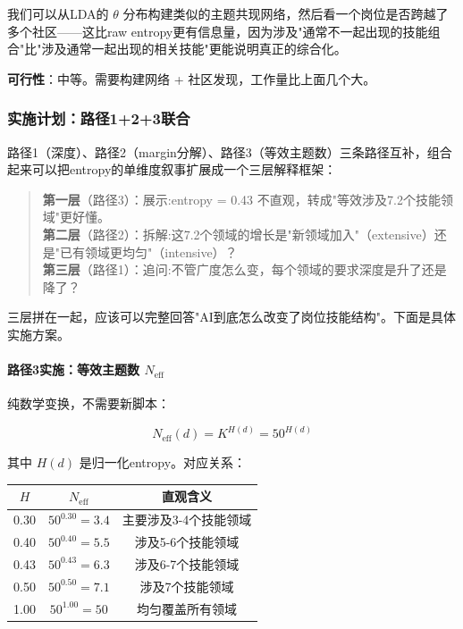 \documentclass[12pt,a4paper]{ctexart}
\begin{document}
我们可以从LDA的 $\theta$ 分布构建类似的主题共现网络，然后看一个岗位是否跨越了多个社区——这比raw entropy更有信息量，因为涉及"通常不一起出现的技能组合"比"涉及通常一起出现的相关技能"更能说明真正的综合化。

\textbf{可行性}：中等。需要构建网络 + 社区发现，工作量比上面几个大。

\subsubsection{实施计划：路径1+2+3联合}

路径1（深度）、路径2（margin分解）、路径3（等效主题数）三条路径互补，组合起来可以把entropy的单维度叙事扩展成一个三层解释框架：

\begin{quote}
\textbf{第一层}（路径3）：展示:entropy = 0.43 不直观，转成"等效涉及7.2个技能领域"更好懂。\\
\textbf{第二层}（路径2）：拆解:这7.2个领域的增长是"新领域加入"（extensive）还是"已有领域更均匀"（intensive）？\\
\textbf{第三层}（路径1）：追问:不管广度怎么变，每个领域的要求深度是升了还是降了？
\end{quote}

三层拼在一起，应该可以完整回答"AI到底怎么改变了岗位技能结构"。下面是具体实施方案。

\paragraph{路径3实施：等效主题数 $N_{\text{eff}}$}

纯数学变换，不需要新脚本：

\begin{equation}
N_{\text{eff}}(d) = K^{H(d)} = 50^{H(d)}
\end{equation}

其中 $H(d)$ 是归一化entropy。对应关系：

\begin{table}[h]
\centering
\small
\begin{tabular}{ccc}
\toprule
$H$ & $N_{\text{eff}}$ & 直观含义 \\
\midrule
0.30 & $50^{0.30} = 3.4$ & 主要涉及3-4个技能领域 \\
0.40 & $50^{0.40} = 5.5$ & 涉及5-6个技能领域 \\
0.43 & $50^{0.43} = 6.3$ & 涉及6-7个技能领域 \\
0.50 & $50^{0.50} = 7.1$ & 涉及7个技能领域 \\
1.00 & $50^{1.00} = 50$ & 均匀覆盖所有领域 \\
\bottomrule
\end{tabular}
\end{table}
\end{document}
